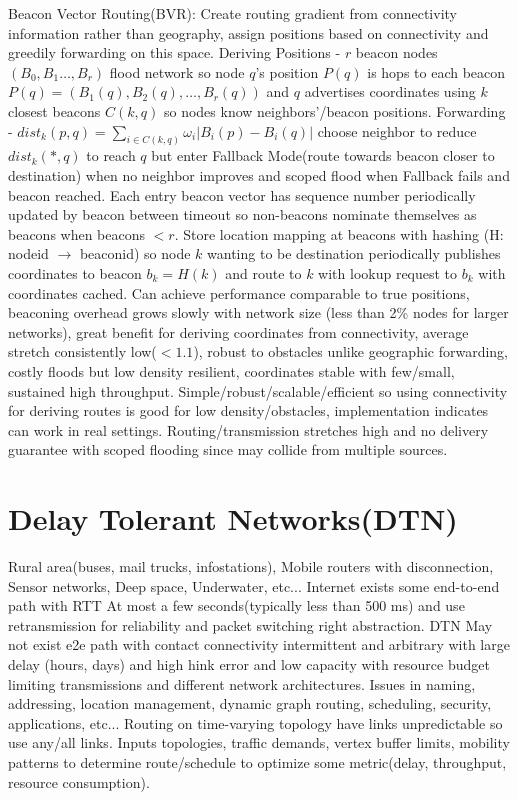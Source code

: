 \documentclass[9pt]{extarticle}
\begin{document}
\begin{multicols}{2}
Beacon Vector Routing(BVR): Create routing gradient from connectivity information rather than geography, assign positions based on connectivity and greedily forwarding on this space. Deriving Positions - $r$ beacon nodes $(B_0,B_1\dots{,B_r})$ flood network so node $q$’s position $P(q)$ is hops to each beacon $P(q) = (B_1(q), B_2(q),\dots{,B_r(q)})$ and $q$ advertises coordinates using $k$ closest beacons $C(k,q)$ so nodes know neighbors’/beacon positions. Forwarding - $dist_k(p,q)=\sum_{i\in{C(k,q)}}\omega_i{|B_i(p)-B_i(q)|}$ choose neighbor to reduce $dist_k(*,q)$ to reach $q$ but enter Fallback Mode(route towards beacon closer to destination) when no neighbor improves and scoped flood when Fallback fails and beacon reached. Each entry beacon vector has sequence number periodically updated by beacon between timeout so non-beacons nominate themselves as beacons when beacons $<r$. Store location mapping at beacons with hashing (H: nodeid $\rightarrow$ beaconid) so node $k$ wanting to be destination periodically publishes coordinates to beacon $b_k=H(k)$ and route to $k$ with lookup request to $b_k$ with coordinates cached. Can achieve performance comparable to true positions, beaconing overhead grows slowly with network size (less than 2\% nodes for larger networks), great benefit for deriving coordinates from connectivity, average stretch consistently low($<1.1$), robust to obstacles unlike geographic forwarding, costly floods but low density resilient, coordinates stable with few/small, sustained high throughput. Simple/robust/scalable/efficient so using connectivity for deriving routes is good for low density/obstacles, implementation indicates can work in real settings. Routing/transmission stretches high and no delivery guarantee with scoped flooding since may collide from multiple sources.

\section{Delay Tolerant Networks(DTN)}

Rural area(buses, mail trucks, infostations), Mobile routers with disconnection, Sensor networks, Deep space, Underwater, etc... Internet exists some end-to-end path with RTT At most a few seconds(typically less than 500 ms) and use retransmission for reliability and packet switching right abstraction. DTN May not exist e2e path with contact connectivity intermittent and arbitrary with large delay (hours, days) and high hink error and low capacity with resource budget limiting transmissions and different network architectures. Issues in naming, addressing, location management, dynamic graph routing, scheduling, security, applications, etc... Routing on time-varying topology have links unpredictable so use any/all links. Inputs topologies, traffic demands, vertex buffer limits, mobility patterns to determine route/schedule to optimize some metric(delay, throughput, resource consumption).


\end{multicols}
\end{document}
